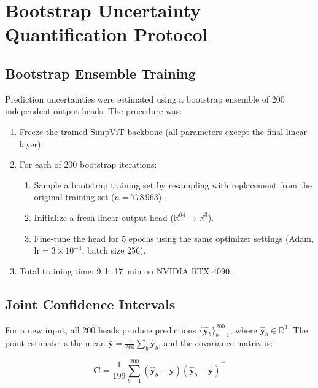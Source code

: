 \documentclass[journal=mamobx,manuscript=suppinfo]{achemso}
\begin{document}
\section{Bootstrap Uncertainty Quantification Protocol}
\label{sec:bootstrap}

\subsection{Bootstrap Ensemble Training}

Prediction uncertainties were estimated using a bootstrap ensemble of 200
independent output heads. The procedure was:

\begin{enumerate}
  \item Freeze the trained SimpViT backbone (all parameters except the
    final linear layer).
  \item For each of 200 bootstrap iterations:
    \begin{enumerate}
      \item Sample a bootstrap training set by resampling with replacement
        from the original training set ($n = 778\,963$).
      \item Initialize a fresh linear output head ($\mathbb{R}^{64} \to
        \mathbb{R}^3$).
      \item Fine-tune the head for 5 epochs using the same optimizer
        settings (Adam, $\mathrm{lr} = 3 \times 10^{-4}$, batch size 256).
    \end{enumerate}
  \item Total training time: 9~h~17~min on NVIDIA RTX 4090.
\end{enumerate}

\subsection{Joint Confidence Intervals}

For a new input, all 200 heads produce predictions
$\{\hat{\mathbf{y}}_b\}_{b=1}^{200}$, where
$\hat{\mathbf{y}}_b \in \mathbb{R}^3$. The point estimate is the mean
$\bar{\mathbf{y}} = \frac{1}{200}\sum_b \hat{\mathbf{y}}_b$, and the
covariance matrix is:

\begin{equation}
  \mathbf{C} = \frac{1}{199} \sum_{b=1}^{200}
    (\hat{\mathbf{y}}_b - \bar{\mathbf{y}})
    (\hat{\mathbf{y}}_b - \bar{\mathbf{y}})^\top
\end{equation}
\end{document}
